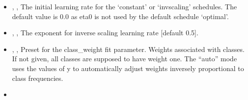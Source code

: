 \begin{itemize}
{      field},
  The learning rate: constant: eta = eta0 optimal: eta = 1.0 / (t + t0)
  [default] invscaling: eta = eta0 / pow(t, power\_t)
  \item {} , ,
  The initial learning rate for the ‘constant’ or ‘invscaling’
  schedules.
  The default value is 0.0 as eta0 is not used by the default schedule
  ‘optimal’.
  \item {} , ,
  The exponent for inverse scaling learning rate [default 0.5].
  \item {} , ,
  Preset for the class\_weight fit parameter.
  Weights associated with classes.
  If not given, all classes are supposed to have weight one.
  The “auto” mode uses the values of y to automatically adjust weights
  inversely proportional to class frequencies.
  \item \warmStartDescription{}
\end{itemize}

